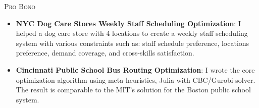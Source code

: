 \documentclass[12pt,a4paper,roman]{moderncv} %
\begin{document}
%

\bigskip

{\textsc{Pro Bono}}{}{}{}{
\begin{itemize}
\item \textbf{NYC Dog Care Stores Weekly Staff Scheduling Optimization}: I helped a dog 
care store with 4 locations to create a weekly staff scheduling system with various 
constraints such as: staff schedule preference, locations preference, demand coverage, and cross-skills satisfaction. 


\item \textbf{Cincinnati Public School Bus Routing Optimization}: I wrote the core optimization algorithm using meta-heuristics, Julia with CBC/Gurobi solver. The result is comparable to the MIT's solution for the Boston public school system.

\end{itemize}


}











\end{document}
